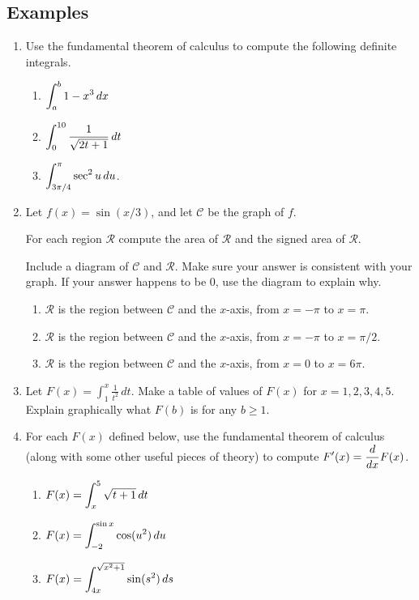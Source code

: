 \subsection*{Examples}
\begin{enumerate}
  \item Use the fundamental theorem of calculus to compute the following definite integrals.
  \begin{enumerate}
    \item $\displaystyle\int_a^b 1-x^3\, dx$
    \item $\displaystyle\int_0^{10} \frac{1}{\sqrt{2t+1}}\, dt$
    \item $\displaystyle\int_{3\pi/4}^{\pi}\sec^2 u\, du$.
  \end{enumerate}
  \item Let $f(x)=\sin(x/3)$, and let $\mathcal{C}$ be the graph of $f$.

  For each region $\mathcal{R}$ compute the area of $\mathcal{R}$ and the signed area of $\mathcal{R}$.

  Include a diagram of $\mathcal{C}$ and $\mathcal{R}$. Make sure your answer is consistent with your graph. If your answer happens to be 0, use the diagram to explain why.
  \begin{enumerate}
    \item $\mathcal{R}$ is the region between $\mathcal{C}$ and the $x$-axis, from $x=-\pi$ to $x=\pi$.
    \item $\mathcal{R}$ is the region between $\mathcal{C}$ and the $x$-axis, from $x=-\pi$ to $x=\pi/2$.
    \item $\mathcal{R}$ is the region between $\mathcal{C}$ and the $x$-axis, from $x=0$ to $x=6\pi$.
  \end{enumerate}
  \item Let $F(x)=\int_1^x \frac{1}{t^2}\, dt$. Make a table of values of $F(x)$ for $x=1, 2, 3, 4, 5$. Explain graphically what $F(b)$ is for any $b\geq 1$.
  \item For each $F(x)$ defined below, use the fundamental theorem of calculus (along with some other useful pieces of theory) to compute $\displaystyle F'(x)=\frac{d}{dx}F(x)$.
  \begin{enumerate}
    \item $\displaystyle F(x)=\int_{x}^5 \sqrt{t+1}\, dt $
    \item $\displaystyle F(x)=\int_{-2}^{\sin x}\cos(u^2) \, du$
    \item $\displaystyle F(x)=\int_{4x}^{\sqrt{x^2+1}}\sin(s^2)\, ds$

  \end{enumerate}
\end{enumerate}




